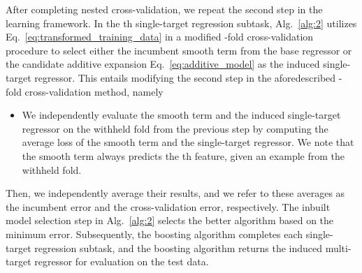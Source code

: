 \documentclass[aps,twocolumn,superscriptaddress,floatfix,preprintnumbers,showkeys]{revtex4}
\begin{document}
After completing nested cross-validation, we repeat the second step in the learning framework. In the th single-target regression subtask, Alg.~\ref{alg:2} utilizes Eq.~\ref{eq:transformed_training_data} in a modified -fold cross-validation procedure to select either the incumbent smooth term from the base regressor or the candidate additive expansion Eq.~\ref{eq:additive_model} as the induced single-target regressor. This entails modifying the second step in the aforedescribed -fold cross-validation method, namely
\begin{itemize}
\item We independently evaluate the smooth term and the induced single-target regressor on the withheld fold from the previous step by computing the average loss of the smooth term and the single-target regressor. We note that the smooth term always predicts the th feature, given an example from the withheld fold.
\end{itemize}
Then, we independently average their  results, and we refer to these averages as the incumbent error and the cross-validation error, respectively. The inbuilt model selection step in Alg.~\ref{alg:2} selects the better algorithm based on the minimum error. Subsequently, the boosting algorithm completes each single-target regression subtask, and the boosting algorithm returns the induced multi-target regressor for evaluation on the test data.
\end{document}
